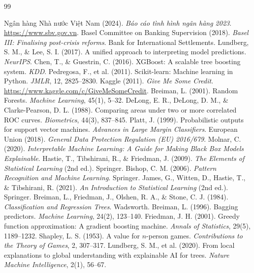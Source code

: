 \documentclass[12pt,a4paper,oneside]{report}
\theoremstyle{vnplain}
\theoremstyle{vndef}
\begin{document}
\begin{thebibliography}{99}
 Ngân hàng Nhà nước Việt Nam (2024). \emph{Báo cáo tình hình ngân hàng 2023}. \url{https://www.sbv.gov.vn}.
 Basel Committee on Banking Supervision (2018). \emph{Basel III: Finalising post-crisis reforms}. Bank for International Settlements.
 Lundberg, S. M., \& Lee, S. I. (2017). A unified approach to interpreting model predictions. \emph{NeurIPS}.
 Chen, T., \& Guestrin, C. (2016). XGBoost: A scalable tree boosting system. \emph{KDD}.
 Pedregosa, F., et al. (2011). Scikit-learn: Machine learning in Python. \emph{JMLR}, 12, 2825--2830.
 Kaggle (2011). \emph{Give Me Some Credit}. \url{https://www.kaggle.com/c/GiveMeSomeCredit}.
 Breiman, L. (2001). Random Forests. \emph{Machine Learning}, 45(1), 5--32.
 DeLong, E. R., DeLong, D. M., \& Clarke-Pearson, D. L. (1988). Comparing areas under two or more correlated ROC curves. \emph{Biometrics}, 44(3), 837--845.
 Platt, J. (1999). Probabilistic outputs for support vector machines. \emph{Advances in Large Margin Classifiers}.
 European Union (2018). \emph{General Data Protection Regulation (EU) 2016/679}.
 Molnar, C. (2020). \emph{Interpretable Machine Learning: A Guide for Making Black Box Models Explainable}.
 Hastie, T., Tibshirani, R., \& Friedman, J. (2009). \emph{The Elements of Statistical Learning} (2nd ed.). Springer.
 Bishop, C. M. (2006). \emph{Pattern Recognition and Machine Learning}. Springer.
 James, G., Witten, D., Hastie, T., \& Tibshirani, R. (2021). \emph{An Introduction to Statistical Learning} (2nd ed.). Springer.
 Breiman, L., Friedman, J., Olshen, R. A., \& Stone, C. J. (1984). \emph{Classification and Regression Trees}. Wadsworth.
 Breiman, L. (1996). Bagging predictors. \emph{Machine Learning}, 24(2), 123--140.
 Friedman, J. H. (2001). Greedy function approximation: A gradient boosting machine. \emph{Annals of Statistics}, 29(5), 1189--1232.
 Shapley, L. S. (1953). A value for $n$-person games. \emph{Contributions to the Theory of Games}, 2, 307--317.
 Lundberg, S. M., et al. (2020). From local explanations to global understanding with explainable AI for trees. \emph{Nature Machine Intelligence}, 2(1), 56--67.

\end{thebibliography}
\end{document}
